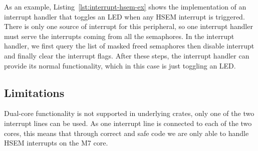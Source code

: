 As an example, Listing~\ref{lst:interrupt-hsem-ex} shows the implementation of an interrupt handler that toggles an LED when any HSEM interrupt is triggered. There is only one source of interrupt for this peripheral, so one interrupt handler must serve the interrupts coming from all the semaphores. In the interrupt handler, we first query the list of masked freed semaphores then disable interrupt and finally clear the interrupt flags. After these steps, the interrupt handler can provide its normal functionality, which in this case is just toggling an LED.

\subsection{Limitations}

Dual-core functionality is not supported in underlying crates, only one of the two interrupt lines can be used. As one interrupt line is connected to each of the two cores, this means that through correct and safe code we are only able to handle HSEM interrupts on the M7 core.
